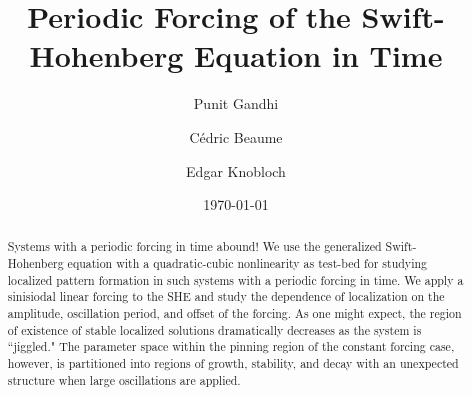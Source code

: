 \documentclass[pre,longbibliography,12pt,a4paper,preprint]{revtex4-1}
\begin{document}


\title{Periodic Forcing of the Swift-Hohenberg Equation in Time}
\author{Punit Gandhi}
\author{C\'edric Beaume}
\author{Edgar Knobloch}
\date{\today}

\begin{abstract}
Systems with a periodic forcing in time abound!  We use the generalized Swift-Hohenberg equation with a quadratic-cubic nonlinearity as test-bed for studying localized pattern formation in such systems with a periodic forcing in time.  We apply a sinisiodal linear forcing to the SHE and study the dependence of localization on the amplitude, oscillation period, and offset of the forcing.  As one might expect, the region of existence of stable localized solutions dramatically decreases as the system is ``jiggled."  The parameter space within the pinning region of the constant forcing case, however, is partitioned into regions of growth, stability, and decay with an unexpected structure when large oscillations are applied. 

\end{abstract}

\maketitle





\newpage







\newpage






\end{document}
